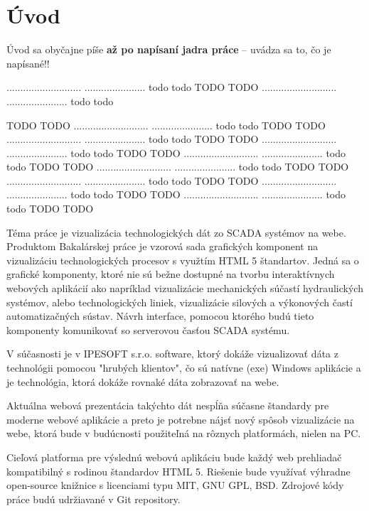 
\chapter*{Úvod}

Úvod sa obyčajne píše \textbf{až po napísaní jadra práce} – uvádza sa to, čo je napísané!!


...........................
...................... todo
todo
TODO 
TODO ...........................
...................... todo
todo

TODO 
TODO ...........................
...................... todo
todo
TODO 
TODO ...........................
...................... todo
todo
TODO 
TODO ...........................
...................... todo
todo
TODO 
TODO ...........................
...................... todo
todo
TODO 
TODO ...........................
...................... todo
todo
TODO 
TODO ...........................
...................... todo
todo
TODO 
TODO ...........................
...................... todo
todo
TODO 
TODO ...........................
...................... todo
todo
TODO 
TODO 




Téma práce je vizualizácia technologických dát zo SCADA systémov na webe.  Produktom Bakalárskej práce je  vzorová sada grafických komponent na vizualizáciu technologických procesov s využtím HTML 5 štandartov.  Jedná sa o grafické komponenty, ktoré nie sú bežne dostupné na tvorbu interaktívnych webových aplikácií ako napríklad vizualizácie mechanických súčastí hydraulických systémov, alebo technologických liniek, vizualizácie silových a výkonových častí automatizačných sústav. 
Návrh  interface, pomocou ktorého budú tieto komponenty komunikovať so serverovou časťou SCADA systému. 

V súčasnosti je v IPESOFT s.r.o. software, ktorý dokáže vizualizovať dáta z technológii pomocou "hrubých klientov",  čo sú natívne (exe) Windows aplikácie a je technológia,  ktorá dokáže rovnaké dáta zobrazovať na webe. 

Aktuálna webová prezentácia takýchto dát nespĺňa súčasne štandardy pre moderne webové aplikácie a preto je potrebne nájsť nový spôsob vizualizácie na webe, ktorá bude v budúcnosti použiteľná na rôznych platformách, nielen na PC. 


Cieľová platforma pre výslednú webovú aplikáciu bude každý web prehliadač kompatibilný s rodinou štandardov HTML 5. Riešenie bude využívať výhradne open-source knižnice s licenciami typu MIT, GNU GPL, BSD. Zdrojové kódy práce budú udržiavané v Git repository.

